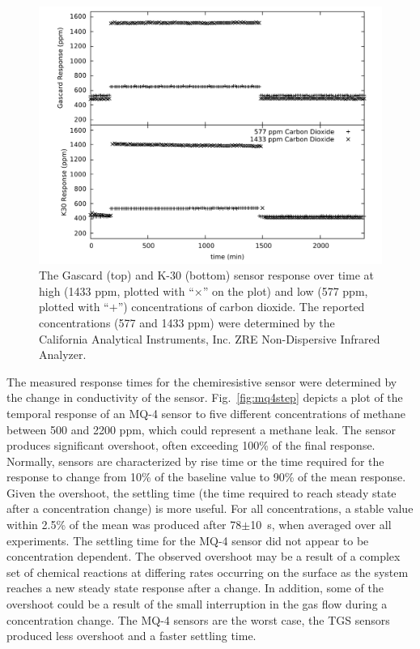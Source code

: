 \documentclass[times]{joehreview}
\begin{document}
	\begin{figure}[!t]
		\centering
		\includegraphics[width=\columnwidth]{honey3.pdf}
		\caption{The Gascard (top) and K-30 (bottom) sensor response over time at high (1433 ppm, plotted with ``$\times$'' on the plot) and low (577 ppm, plotted with ``$+$'') concentrations of carbon dioxide.  The reported concentrations (577 and 1433 ppm) were determined by the California Analytical Instruments, Inc. ZRE Non-Dispersive Infrared Analyzer.}
		\label{fig:peakdetailco2}
	\end{figure}
	
	The measured response times for the chemiresistive sensor were determined by the change in conductivity of the sensor.  Fig.~\ref{fig:mq4step} depicts a plot of the temporal response of an MQ-4 sensor to five different concentrations of methane between 500 and 2200 ppm, which could represent a methane leak. The sensor produces significant overshoot, often exceeding 100\% of the final response.  Normally, sensors are characterized by rise time or the time required for the response to change from 10\% of the baseline value to 90\% of the mean response.  Given the overshoot, the settling time (the time required to reach steady state after a concentration change) is more useful.  For all concentrations, a stable value within 2.5\% of the mean was produced after 78$\pm$\SI{10}{\second}, when averaged over all experiments.  The settling time for the MQ-4 sensor did not appear to be concentration dependent.  The observed overshoot may be a result of a complex set of chemical reactions at differing rates occurring on the surface as the system reaches a new steady state response after a change.  In addition, some of the overshoot could be a result of the small interruption in the gas flow during a concentration change. The MQ-4 sensors are the worst case, the TGS sensors produced less overshoot and a faster settling time.
	
\end{document}

